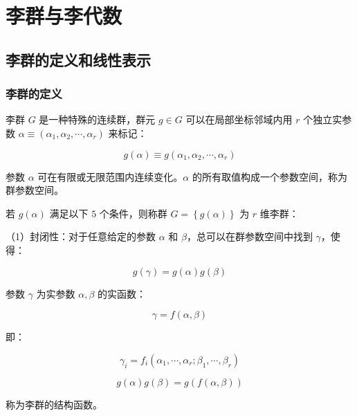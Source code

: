 \chapter{李群与李代数}

\section{李群的定义和线性表示}

\subsection{李群的定义}

李群 $G$ 是一种特殊的连续群，群元 $g\in G$ 可以在局部坐标邻域内用 $r$ 个独立实参数 $\alpha\equiv \left(\alpha_1,\alpha_2,\cdots,\alpha_r\right)$ 来标记：

\begin{equation}
g\left(\alpha\right)
\equiv g\left(\alpha_1,\alpha_2,\cdots,\alpha_r\right)
\end{equation}

参数 $\alpha$ 可在有限或无限范围内连续变化。$\alpha$ 的所有取值构成一个参数空间，称为群参数空间。

若 $g\left(\alpha\right)$ 满足以下 $5$ 个条件，则称群 $G=\left\{g\left(\alpha\right) \right\}$ 为 $r$ 维李群：

（1）封闭性：对于任意给定的参数 $\alpha$ 和 $\beta$，总可以在群参数空间中找到 $\gamma$，使得：

\begin{equation}
g\left(\gamma\right)
=g\left(\alpha\right)g\left(\beta\right)
\end{equation}

参数 $\gamma$ 为实参数 $\alpha,\beta$ 的实函数：

\begin{equation}
\gamma
=f\left(\alpha,\beta\right)
\end{equation}

即：

\begin{equation}
\gamma_i
=f_i\left(\alpha_1,\cdots,\alpha_r;\beta_1,\cdots,\beta_r\right)
\end{equation}

\begin{equation}
g\left(\alpha\right)g\left(\beta\right) = g\left(f\left(\alpha,\beta\right)\right)
\end{equation}

称为李群的结构函数。

